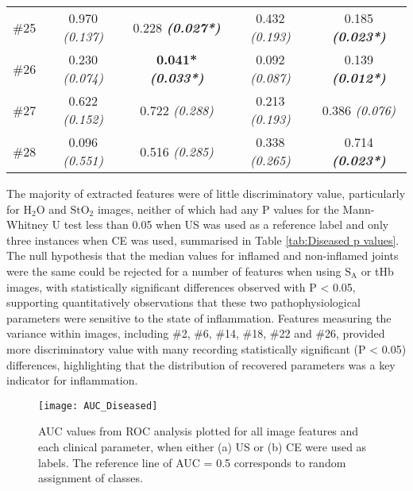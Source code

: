 \documentclass[twoside]{bhamthesis}
\theoremstyle{definition}
\begin{document}
\begin{table}[!ht]
\begin{center}
\begin{tabular}{|c| c c c c|}
\rule[-1ex]{0pt}{3.5ex}  \#25 & 0.970 \textit{(0.137)} & 0.228 \textbf{\textit{(0.027*)}} & 0.432 \textit{(0.193)} & 0.185 \textbf{\textit{(0.023*)}} \\
\rule[-1ex]{0pt}{3.5ex}  \#26 & 0.230 \textit{(0.074)} & \textbf{0.041*}\textbf{ \textit{(0.033*)} } & 0.092 \textit{(0.087)} & 0.139 \textbf{\textit{(0.012*)}} \\ 
\rule[-1ex]{0pt}{3.5ex}  \#27 & 0.622 \textit{(0.152)} & 0.722 \textit{(0.288)} & 0.213 \textit{(0.193)} & 0.386 \textit{(0.076)} \\
\rule[-1ex]{0pt}{3.5ex}  \#28 & 0.096 \textit{(0.551)} & 0.516 \textit{(0.285)} & 0.338 \textit{(0.265)} & 0.714 \textbf{\textit{(0.023*)}} \\

\hline
\end{tabular}
\end{center}
\end{table} 

The majority of extracted features were of little discriminatory value, particularly for $\mathrm{H_2O}$ and $\mathrm{StO_2}$ images, neither of which had any P values for the Mann-Whitney U test less than 0.05 when US was used as a reference label and only three instances when CE was used, summarised in Table \ref{tab:Diseased p values}. The null hypothesis that the median values for inflamed and non-inflamed joints were the same could be rejected for a number of features when using $\mathrm{S_A}$ or tHb images, with statistically significant differences observed with P < 0.05, supporting quantitatively observations that these two pathophysiological parameters were sensitive to the state of inflammation. Features measuring the variance within images, including  \#2, \#6, \#14, \#18, \#22 and \#26, provided more discriminatory value with  many recording statistically significant (P < 0.05) differences, highlighting that the distribution of recovered parameters was a key indicator for inflammation.
 
\begin{figure}[!ht]
\centering\texttt{[image: AUC\_Diseased]}\caption{AUC values from ROC analysis plotted for all image features and each clinical parameter, when either (a) US or (b) CE were used as labels. The reference line of AUC = 0.5 corresponds to random assignment of classes.}
\label{fig:AUC_Diseased}
\end{figure}
\end{document}
